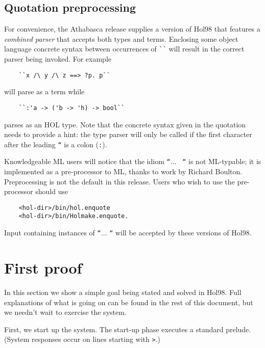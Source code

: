 \documentclass[12pt,fleqn,layout,a4paper]{report}
\begin{document}
\subsection{Quotation preprocessing}

For convenience, the Athabasca release supplies a version of Hol98 that
features a {\it combined parser\/} that accepts both types and
terms. Enclosing some object language concrete syntax between
occurrences of \verb+``+ will result in the correct parser being
invoked. For example

\begin{verbatim}
    ``x /\ y /\ z ==> ?p. p``
\end{verbatim}

\noindent will parse as a term while

\begin{verbatim}
    ``:'a -> ('b -> 'h) -> bool``
\end{verbatim}

\noindent parses as an HOL type. Note that the concrete syntax given in
the quotation needs to provide a hint: the type parser will only be
called if the first character after the leading {\tt ``} is a colon (\verb+:+).

Knowledgeable ML users will notice that the idiom {\tt ``}$\ldots$ {\tt
``} is not ML-typable; it is implemented as a pre-processor to ML,
thanks to work by Richard Boulton. Preprocessing is not the default in
this release. Users who wish to use the pre-processor should use

\begin{verbatim}
    <hol-dir>/bin/hol.enquote
    <hol-dir>/bin/Holmake.enquote.
\end{verbatim}

Input containing instances of {\tt ``}$\ldots$ {\tt ``} will be accepted
by these versions of Hol98.

\section{First proof}

In this section we show a simple goal being stated and solved in
Hol98. Full explanations of what is going on can be found in the rest of
this document, but we needn't wait to exercise the system.

First, we start up the system. The start-up phase executes a standard
prelude. (System responses occur on lines starting with \verb+>+.)
\end{document}
